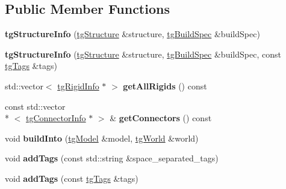 \subsection*{Public Member Functions}
\begin{DoxyCompactItemize}
\item 
\hypertarget{classtg_structure_info_aa28bfab1e1df32cd3df295b7f97f9b55}{{\bfseries tg\-Structure\-Info} (\hyperlink{classtg_structure}{tg\-Structure} \&structure, \hyperlink{classtg_build_spec}{tg\-Build\-Spec} \&build\-Spec)}\label{classtg_structure_info_aa28bfab1e1df32cd3df295b7f97f9b55}

\item 
\hypertarget{classtg_structure_info_a70ee86f7e16e2f700cb11cd2e32a7b04}{{\bfseries tg\-Structure\-Info} (\hyperlink{classtg_structure}{tg\-Structure} \&structure, \hyperlink{classtg_build_spec}{tg\-Build\-Spec} \&build\-Spec, const \hyperlink{classtg_tags}{tg\-Tags} \&tags)}\label{classtg_structure_info_a70ee86f7e16e2f700cb11cd2e32a7b04}

\item 
\hypertarget{classtg_structure_info_a89b75c64d820748ffaab6cd451a319f6}{std\-::vector$<$ \hyperlink{classtg_rigid_info}{tg\-Rigid\-Info} $\ast$ $>$ {\bfseries get\-All\-Rigids} () const }\label{classtg_structure_info_a89b75c64d820748ffaab6cd451a319f6}

\item 
\hypertarget{classtg_structure_info_ac2ecc7c99c204dc6195abaceee180656}{const std\-::vector\\*
$<$ \hyperlink{classtg_connector_info}{tg\-Connector\-Info} $\ast$ $>$ \& {\bfseries get\-Connectors} () const }\label{classtg_structure_info_ac2ecc7c99c204dc6195abaceee180656}

\item 
\hypertarget{classtg_structure_info_a249e4486a0b8baf7720aa5c2e13db353}{void {\bfseries build\-Into} (\hyperlink{classtg_model}{tg\-Model} \&model, \hyperlink{classtg_world}{tg\-World} \&world)}\label{classtg_structure_info_a249e4486a0b8baf7720aa5c2e13db353}

\item 
\hypertarget{classtg_taggable_af0b8f1729653b0b90d2fecbd51163612}{void {\bfseries add\-Tags} (const std\-::string \&space\-\_\-separated\-\_\-tags)}\label{classtg_taggable_af0b8f1729653b0b90d2fecbd51163612}

\item 
\hypertarget{classtg_taggable_af28e3fe1a7e4eb28772dc006d575dd1f}{void {\bfseries add\-Tags} (const \hyperlink{classtg_tags}{tg\-Tags} \&tags)}\label{classtg_taggable_af28e3fe1a7e4eb28772dc006d575dd1f}


\end{DoxyCompactItemize}
